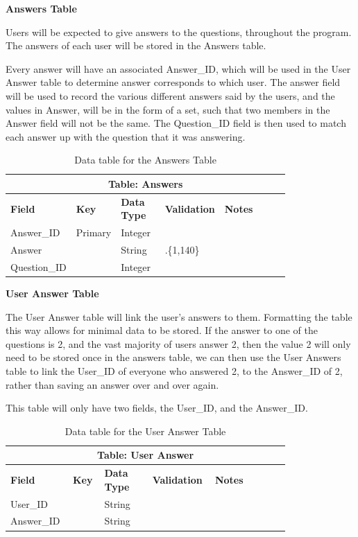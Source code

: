 \documentclass[12pt]{article}
\begin{document}
\clearpage

\textbf{Answers Table}

Users will be expected to give answers to the questions, throughout the program. The answers of each user will be stored in the Answers table.

Every answer will have an associated Answer\_ID, which will be used in the User Answer table to determine answer corresponds to which user. The answer field will be used to record the various different answers said by the users, and the values in Answer, will be in the form of a set, such that two members in the Answer field will not be the same. The Question\_ID field is then used to match each answer up with the question that it was answering.

\begin{table}[ht]
    \centering
    \begin{tabular}{ | p{0.15\linewidth} | p{0.1\linewidth} | p{0.16\linewidth} | p{0.14\linewidth} | p{0.25\linewidth} | }
    \hline
    \multicolumn{5}{|c|}{\textbf{Table: Answers}}\\
    \hline
    \hline
    \textbf{Field} & \textbf{Key} & \textbf{Data Type} & \textbf{Validation} & \textbf{Notes} \\
    \hline
    Answer\_ID & Primary & Integer & & \\
    \hline
    Answer & & String & .\{1,140\} & \\
    \hline
    Question\_ID & & Integer & & \\
    \hline
    \end{tabular}
    \caption{Data table for the Answers Table}
\end{table}

\textbf{User Answer Table}

The User Answer table will link the user's answers to them. Formatting the table this way allows for minimal data to be stored. If the answer to one of the questions is 2, and the vast majority of users answer 2, then the value 2 will only need to be stored once in the answers table, we can then use the User Answers table to link the User\_ID of everyone who answered 2, to the Answer\_ID of 2, rather than saving an answer over and over again.

This table will only have two fields, the User\_ID, and the Answer\_ID.

\begin{table}[ht]
    \centering
    \begin{tabular}{ | p{0.15\linewidth} | p{0.1\linewidth} | p{0.16\linewidth} | p{0.14\linewidth} | p{0.25\linewidth} | }
    \hline
    \multicolumn{5}{|c|}{\textbf{Table: User Answer}}\\
    \hline
    \hline
    \textbf{Field} & \textbf{Key} & \textbf{Data Type} & \textbf{Validation} & \textbf{Notes} \\
    \hline
    User\_ID & & String & & \\
    \hline
    Answer\_ID & & String & & \\
    \hline
    \end{tabular}
    \caption{Data table for the User Answer Table}
\end{table}
\end{document}
